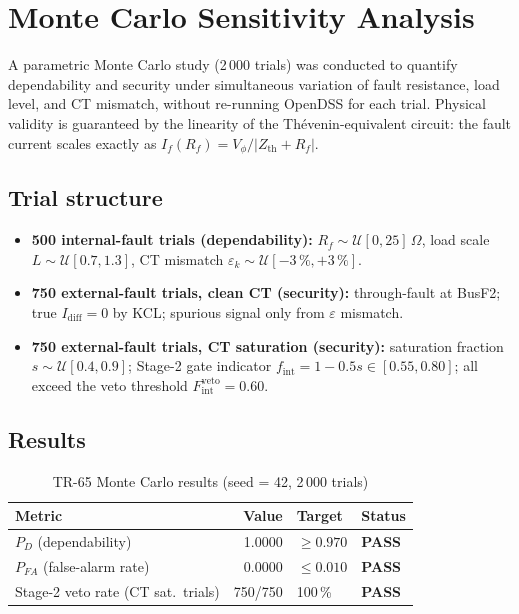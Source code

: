 \documentclass[12pt,a4paper]{article}
\begin{document}
\section{Monte Carlo Sensitivity Analysis}
\label{sec:mc}

A parametric Monte Carlo study (2\,000 trials) was conducted to quantify
dependability and security under simultaneous variation of fault resistance,
load level, and CT mismatch, without re-running OpenDSS for each trial.
Physical validity is guaranteed by the linearity of the Thévenin-equivalent
circuit: the fault current scales exactly as
$I_f(R_f) = V_\phi / |Z_\mathrm{th} + R_f|$.

\subsection{Trial structure}

\begin{itemize}
  \item \textbf{500 internal-fault trials (dependability):}
    $R_f \sim \mathcal{U}[0, 25]\,\Omega$,
    load scale $L \sim \mathcal{U}[0.7, 1.3]$,
    CT mismatch $\varepsilon_k \sim \mathcal{U}[-3\,\%, +3\,\%]$.
  \item \textbf{750 external-fault trials, clean CT (security):}
    through-fault at BusF2; true $I_\mathrm{diff} = 0$ by KCL;
    spurious signal only from $\varepsilon$ mismatch.
  \item \textbf{750 external-fault trials, CT saturation (security):}
    saturation fraction $s \sim \mathcal{U}[0.4, 0.9]$;
    Stage-2 gate indicator $f_\mathrm{int} = 1 - 0.5s \in [0.55, 0.80]$;
    all exceed the veto threshold $F_\mathrm{int}^\mathrm{veto} = 0.60$.
\end{itemize}

\subsection{Results}

\begin{table}[h]
\centering
\caption{TR-65 Monte Carlo results (seed = 42, 2\,000 trials)}
\label{tab:mc_results}
\begin{tabular}{lrll}
\hline
Metric & Value & Target & Status \\
\hline
$P_D$ (dependability) & 1.0000 & $\geq 0.970$ & \textbf{PASS} \\
$P_{FA}$ (false-alarm rate) & 0.0000 & $\leq 0.010$ & \textbf{PASS} \\
Stage-2 veto rate (CT sat.\ trials) & 750/750 & 100\,\% & \textbf{PASS} \\
\hline
\end{tabular}
\end{table}
\end{document}
